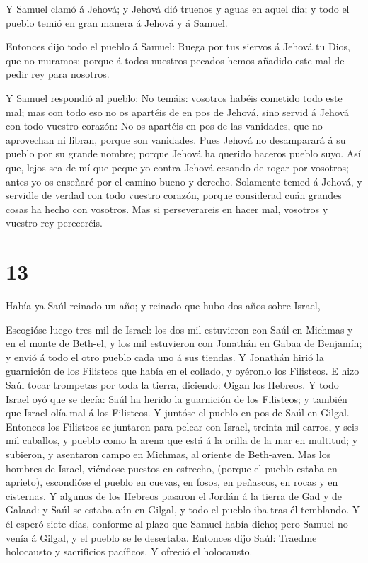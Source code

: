  Y Samuel clamó á Jehová; y Jehová dió truenos y aguas en
aquel día; y todo el pueblo temió en gran manera á Jehová y á Samuel.

 Entonces dijo todo el pueblo á Samuel: Ruega por tus
siervos á Jehová tu Dios, que no muramos: porque á todos nuestros
pecados hemos añadido este mal de pedir rey para nosotros.

 Y Samuel respondió al pueblo: No temáis: vosotros habéis
cometido todo este mal; mas con todo eso no os apartéis de en pos de
Jehová, sino servid á Jehová con todo vuestro corazón:  No
os apartéis en pos de las vanidades, que no aprovechan ni libran, porque
son vanidades.  Pues Jehová no desamparará á su pueblo por
su grande nombre; porque Jehová ha querido haceros pueblo suyo.
 Así que, lejos sea de mí que peque yo contra Jehová
cesando de rogar por vosotros; antes yo os enseñaré por el camino bueno
y derecho.  Solamente temed á Jehová, y servidle de verdad
con todo vuestro corazón, porque considerad cuán grandes cosas ha hecho
con vosotros.  Mas si perseverareis en hacer mal, vosotros
y vuestro rey pereceréis.

\hypertarget{section-12}{%
\section{13}\label{section-12}}

 Había ya Saúl reinado un año; y reinado que hubo dos años
sobre Israel,

 Escogióse luego tres mil de Israel: los dos mil estuvieron
con Saúl en Michmas y en el monte de Beth-el, y los mil estuvieron con
Jonathán en Gabaa de Benjamín; y envió á todo el otro pueblo cada uno á
sus tiendas.  Y Jonathán hirió la guarnición de los
Filisteos que había en el collado, y oyéronlo los Filisteos. E hizo Saúl
tocar trompetas por toda la tierra, diciendo: Oigan los Hebreos.
 Y todo Israel oyó que se decía: Saúl ha herido la
guarnición de los Filisteos; y también que Israel olía mal á los
Filisteos. Y juntóse el pueblo en pos de Saúl en Gilgal. 
Entonces los Filisteos se juntaron para pelear con Israel, treinta mil
carros, y seis mil caballos, y pueblo como la arena que está á la orilla
de la mar en multitud; y subieron, y asentaron campo en Michmas, al
oriente de Beth-aven.  Mas los hombres de Israel, viéndose
puestos en estrecho, (porque el pueblo estaba en aprieto), escondióse el
pueblo en cuevas, en fosos, en peñascos, en rocas y en cisternas.
 Y algunos de los Hebreos pasaron el Jordán á la tierra de
Gad y de Galaad: y Saúl se estaba aún en Gilgal, y todo el pueblo iba
tras él temblando.  Y él esperó siete días, conforme al
plazo que Samuel había dicho; pero Samuel no venía á Gilgal, y el pueblo
se le desertaba.  Entonces dijo Saúl: Traedme holocausto y
sacrificios pacíficos. Y ofreció el holocausto.

